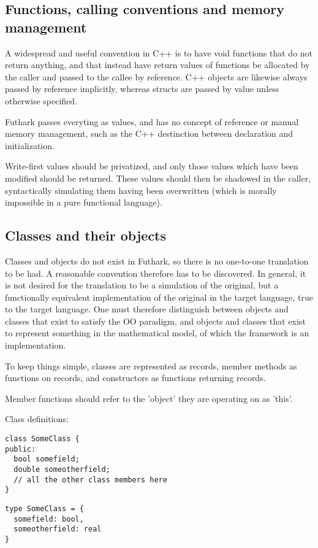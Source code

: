 \subsection{Functions, calling conventions and memory management}
A widespread and useful convention in C++ is to have void functions that do not return anything, and that instead have return values of functions be allocated by the caller and passed to the callee by reference. C++ objects are likewise always passed by reference implicitly, whereas structs are passed by value unless otherwise specified.

Futhark passes everyting as values, and has no concept of reference or manual memory management, such as the C++ destinction between declaration and initialization.

Write-first values should be privatized, and only those values which have been modified should be returned. These values should then be shadowed in the caller, syntactically simulating them having been overwritten (which is morally impossible in a pure functional language).

\subsection{Classes and their objects}
Classes and objects do not exist in Futhark, so there is no one-to-one translation to be had. A reasonable convention therefore has to be discovered. In general, it is not desired for the translation to be a simulation of the original, but a functionally equivalent implementation of the original in the target language, true to the target language. One must therefore distinguish between objects and classes that exist to satisfy the OO paradigm, and objects and classes that exist to represent something in the mathematical model, of which the framework is an implementation.

To keep things simple, classes are represented as records, member methods as functions on records, and constructors as functions returning records.

Member functions should refer to the 'object' they are operating on as 'this'.

Class definitions:
\begin{verbatim}
class SomeClass {
public:
  bool somefield;
  double someotherfield;
  // all the other class members here
}
\end{verbatim}

\begin{verbatim}
type SomeClass = {
  somefield: bool,
  someotherfield: real
}
\end{verbatim}

